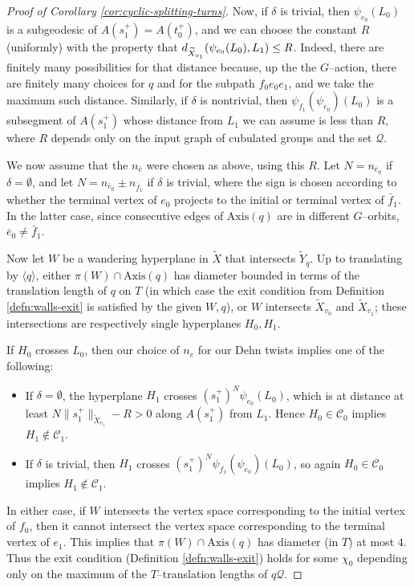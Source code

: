 \documentclass[11pt,oneside]{amsart}
\newcounter{ax}
\theoremstyle{definition}
\newcommand{\dist}{\textup{\textsf{d}}}
\newcommand{\axis}{\mathrm{Axis}}
\begin{document}
\begin{proof}[Proof of Corollary \ref{cor:cyclic-splitting-turns}]
Now, if $\delta$ is trivial, then $\psi_{e_0}(L_0)$ is a subgeodesic of $A(s_1^+)=A(t_0^+)$, and we can choose the constant $R$ (uniformly) with the property that $\dist_{\widetilde X_{v_1}}(\psi_{e_0}(L_0),L_1)\leq R$.  Indeed, there are finitely many possibilities for that distance because, up the the $G$--action, there are finitely many choices for $q$ and for the subpath $f_0e_0e_1$, and we take the maximum such distance.  Similarly, if $\delta$ is nontrivial, then $\psi_{f_1}(\psi_{e_0})(L_0)$ is a subsegment of $A(s_1^+)$ whose distance from $L_1$ we can assume is less than $R$, where $R$ depends only on the input graph of cubulated groups and the set $\mathcal Q$.

We now assume that the $n_{\bar e}$ were chosen as above, using this $R$.  Let $N=n_{\bar e_0}$ if $\delta=\emptyset$, and let $N=n_{\bar e_0}\pm n_{\bar f_1}$ if $\delta$ is trivial, where the sign is chosen according to whether the terminal vertex of $e_0$ projects to the initial or terminal vertex of $\bar f_1$.  In the latter case, since consecutive edges of $\axis(q)$ are in different $G$--orbits, $\bar e_0\neq \bar f_1$.

Now let $W$ be a wandering hyperplane in $\widetilde X$ that intersects $\widetilde Y_q$.  Up to translating by $\langle q\rangle$, either $\pi(W)\cap \axis(q)$ has diameter bounded in terms of the translation length of $q$ on $T$ (in which case the exit condition from Definition \ref{defn:walls-exit} is satisfied by the given $W,q$), or $W$ intersects $\widetilde X_{v_0}$ and $\widetilde X_{v_1}$; these intersections are respectively single hyperplanes $H_0,H_1$.  

If $H_0$ crosses $L_0$, then our choice of $n_e$ for our Dehn twists implies one of the following:
\begin{itemize}
    \item If $\delta=\emptyset$, the hyperplane $H_1$ crosses $(s_1^+)^N\psi_{e_0}(L_0)$, which is at distance at least $N\|s_1^+\|_{\widetilde X_{v_1}}-R>0$ along $A(s_1^+)$ from $L_1$.  Hence $H_0\in\mathcal C_0$ implies $H_1\not\in\mathcal C_1$.

    \item If $\delta$ is trivial, then $H_1$ crosses $(s_1^+)^N\psi_{f_1}(\psi_{e_0})(L_0)$, so again  $H_0\in\mathcal C_0$ implies $H_1\not\in\mathcal C_1$.
\end{itemize}

In either case, if $W$ intersects the vertex space corresponding to the initial vertex of $f_0$, then it cannot intersect the vertex space corresponding to the terminal vertex of $e_1$.  This implies that $\pi(W)\cap\axis(q)$ has diameter (in $T$) at most $4$.  Thus the exit condition (Definition \ref{defn:walls-exit}) holds for some $\chi_0$ depending only on the maximum of the $T$--translation lengths of $q\mathcal Q$.


\end{proof}
\end{document}
